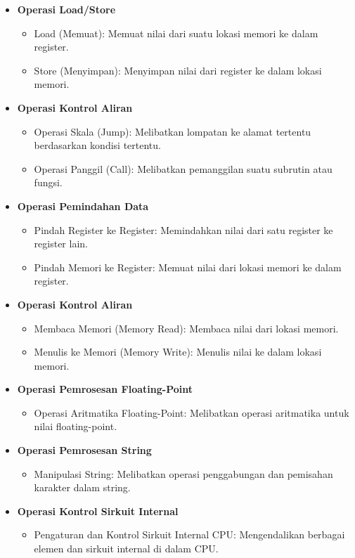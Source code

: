 \begin{itemize}
  \item \textbf{Operasi Load/Store}
    \begin{itemize}
      \item Load (Memuat): Memuat nilai dari suatu lokasi memori ke dalam register.
      \item Store (Menyimpan): Menyimpan nilai dari register ke dalam lokasi memori.
    \end{itemize}

  \item \textbf{Operasi Kontrol Aliran}
  \begin{itemize}
    \item Operasi Skala (Jump): Melibatkan lompatan ke alamat tertentu berdasarkan kondisi tertentu.
    \item Operasi Panggil (Call): Melibatkan pemanggilan suatu subrutin atau fungsi.
  \end{itemize}

  \item \textbf{Operasi Pemindahan Data}
  \begin{itemize}
    \item Pindah Register ke Register: Memindahkan nilai dari satu register ke register lain.
    \item Pindah Memori ke Register: Memuat nilai dari lokasi memori ke dalam register.
  \end{itemize}

\item \textbf{Operasi Kontrol Aliran}
    \begin{itemize}
      \item Membaca Memori (Memory Read): Membaca nilai dari lokasi memori.
      \item Menulis ke Memori (Memory Write): Menulis nilai ke dalam lokasi memori.
    \end{itemize}

  \item \textbf{Operasi Pemrosesan Floating-Point}
    \begin{itemize}
      \item  Operasi Aritmatika Floating-Point: Melibatkan operasi aritmatika untuk nilai floating-point.
    \end{itemize}

  \item \textbf{Operasi Pemrosesan String}
  \begin{itemize}
    \item Manipulasi String: Melibatkan operasi penggabungan dan pemisahan karakter dalam string.
  \end{itemize}

  \item \textbf{Operasi Kontrol Sirkuit Internal}
  \begin{itemize}
    \item  Pengaturan dan Kontrol Sirkuit Internal CPU: Mengendalikan berbagai elemen dan sirkuit internal di dalam CPU.
  \end{itemize}

\end{itemize}
